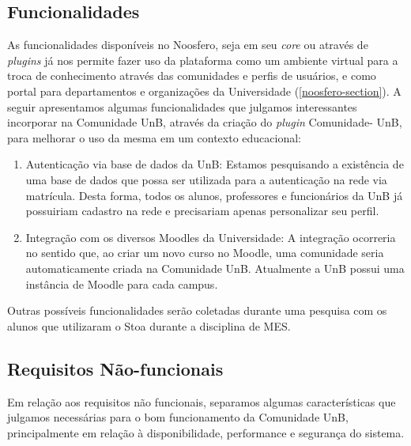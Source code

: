 \subsection{Funcionalidades}

As funcionalidades disponíveis no Noosfero, seja em seu \textit{core}
ou através de \textit{plugins} já nos permite fazer uso da plataforma como
um ambiente virtual para a troca de conhecimento através das comunidades e
perfis de usuários, e como portal para departamentos e organizações da
Universidade (\ref{noosfero-section}).
%
A seguir apresentamos algumas funcionalidades que julgamos interessantes
incorporar na Comunidade UnB, através da criação do \textit{plugin} Comunidade-
UnB, para melhorar o uso da mesma em um contexto educacional:

	\begin{enumerate}
		\item Autenticação via base de dados da UnB:
		Estamos pesquisando a existência de uma base de dados que possa
		ser utilizada para a autenticação na rede via matrícula. Desta forma,
		todos os alunos, professores e funcionários da UnB já possuiriam
		cadastro na rede e precisariam apenas personalizar seu perfil.
		\item Integração com os diversos Moodles da Universidade:
		A integração ocorreria no sentido que, ao criar um novo curso no
		Moodle, uma comunidade seria automaticamente criada na Comunidade
		UnB. Atualmente a UnB possui uma instância de Moodle para cada
		campus.
	\end{enumerate}

Outras possíveis funcionalidades serão coletadas durante uma pesquisa com os
alunos que utilizaram o Stoa durante a disciplina de MES.

\subsection{Requisitos Não-funcionais}

Em relação aos requisitos não funcionais, separamos algumas características que
julgamos necessárias para o bom funcionamento da Comunidade UnB, principalmente
em relação à disponibilidade, performance e segurança do sistema.

